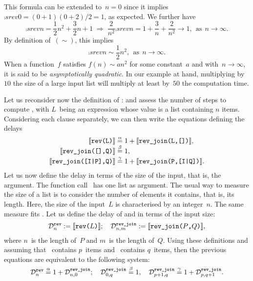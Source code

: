 This formula can be extended to~\(n=0\) since it implies
\(\comp{srev}{0} = (0+1)(0+2)/2 = 1\), as expected. We further have
\[
\comp{srev}{n} = \frac{1}{2}{n^2} + \frac{3}{2}{n} + 1
\;\Rightarrow\;
\frac{2}{n^2}{\comp{srev}{n}} = 1 + \frac{3}{n} + \frac{2}{n^2}
\rightarrow 1,\,\; \text{as} \,\; n \rightarrow \infty.
\]
By definition of~\((\sim)\), this implies
\[
\comp{srev}{n} \mathrel{\sim} \frac{1}{2}{n^2}, \,\; \text{as} \;\,
n \rightarrow \infty.
\]
When a function~\(f\) satisfies \(f(n) \mathrel{\sim} a n^2\) for some
constant~\(a\) and with~\(n \rightarrow \infty\), it is said to be
\emph{asymptotically quadratic}. In our example at hand, multiplying
by~\(10\) the size of a large input list will multiply at least
by~\(50\) the computation time.

Let us reconsider now the definition of 
:  and assess the number
of steps to compute , with \(L\)~being an
expression whose value is a list containing \(n\) items. Considering
each clause separately, we can then write the equations defining the
delays
\begin{align*}
\delay{rev(L)}             &\eqn{\alpha} 1 + \delay{rev\_join(L,[])},\\
\delay{rev\_join([],Q)}    &\eqn{\beta} 1,\\
\delay{rev\_join([I|P],Q)} &\eqn{\gamma} 1 + \delay{rev\_join(P,[I|Q])}.
\end{align*}
Let us now define the delay in terms of the size of the input, that
is, the argument. The function call~ has one list
as argument. The usual way to measure the size of a list is to
consider the number of elements it contains, that is, its
length. Here, the size of the input~\(L\) is characterised by an
integer~\(n\). The same measure fits . Let us
define the delay of  and  in terms
of the input size:
\[
\comp{rev}{n} := \delay{rev(\(L\))};\quad
\comp{rev\_join}{n,m} := \delay{rev\_join(\(P\),\(Q\))},
\]
where \(n\)~is the length of~\(P\) and \(m\)~is the length
of~\(Q\). Using these definitions and assuming that
~contains \(p\)~items and ~contains \(q\)~items,
then the previous equations are equivalent to the following system:
\begin{equation}
\comp{rev}{n} \eqn{\alpha} 1 + \comp{rev\_join}{n,0};\quad
\comp{rev\_join}{0,q} \eqn{\beta} 1,\quad
\comp{rev\_join}{p+1,q} \eqn{\gamma} 1 + \comp{rev\_join}{p,q+1}.
\label{eq:rev_join_p_q}
\end{equation}
